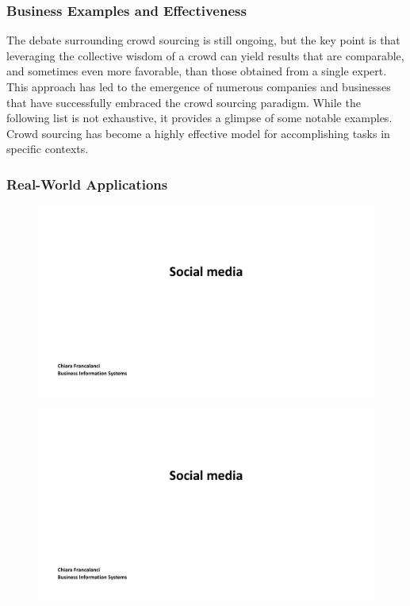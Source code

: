 \subsubsection{Business Examples and
    Effectiveness}\label{business-examples-and-effectiveness}

The debate surrounding crowd sourcing is still ongoing, but the key
point is that leveraging the collective wisdom of a crowd can yield
results that are comparable, and sometimes even more favorable, than
those obtained from a single expert. This approach has led to the
emergence of numerous companies and businesses that have successfully
embraced the crowd sourcing paradigm. While the following list is not
exhaustive, it provides a glimpse of some notable examples. Crowd
sourcing has become a highly effective model for accomplishing tasks in
specific contexts.

\subsubsection{Real-World Applications}\label{real-world-applications}

\begin{figure}[!h]
    \centering
    \includegraphics[page=8, trim = 0cm 2cm 8cm 4cm, clip, width=\textwidth]{images/04 - Social_Media.pdf}
\end{figure}

\begin{figure}[!h]
    \centering
    \includegraphics[page=9, trim = 1.5cm 2.5cm 1.5cm 3.5cm, clip, width=\textwidth]{images/04 - Social_Media.pdf}
\end{figure}

